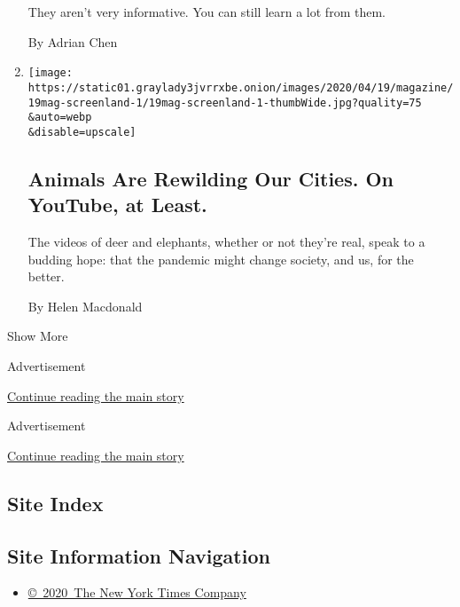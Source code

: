 \begin{enumerate}
  They aren't very informative. You can still learn a lot from them.

  By Adrian Chen
\item
  \href{/2020/04/15/magazine/quarantine-animal-videos-coronavirus.html}{}

  \texttt{[image: https://static01.graylady3jvrrxbe.onion/images/2020/04/19/magazine/19mag-screenland-1/19mag-screenland-1-thumbWide.jpg?quality=75\\\&auto=webp\\\&disable=upscale]}

  \hypertarget{animals-are-rewilding-our-cities-on-youtube-at-least}{%
  \subsection{Animals Are Rewilding Our Cities. On YouTube, at
  Least.}\label{animals-are-rewilding-our-cities-on-youtube-at-least}}

  The videos of deer and elephants, whether or not they're real, speak
  to a budding hope: that the pandemic might change society, and us, for
  the better.

  By Helen Macdonald
\end{enumerate}

Show More

Advertisement

\protect\hyperlink{after-mid1}{Continue reading the main story}

Advertisement

\protect\hyperlink{after-mktg}{Continue reading the main story}

\hypertarget{site-index}{%
\subsection{Site Index}\label{site-index}}

\hypertarget{site-information-navigation}{%
\subsection{Site Information
Navigation}\label{site-information-navigation}}

\begin{itemize}
\tightlist
\item
  \href{https://help.nytimes3xbfgragh.onion/hc/en-us/articles/115014792127-Copyright-notice}{©~2020~The
  New York Times Company}
\end{itemize}

